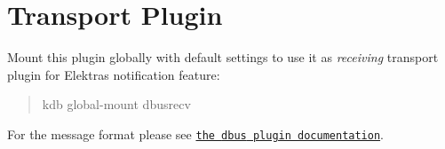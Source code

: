 \section*{Transport Plugin}

Mount this plugin globally with default settings to use it as {\itshape receiving} transport plugin for Elektra\textquotesingle{}s notification feature\+:

\begin{quote}
kdb global-\/mount dbusrecv \end{quote}


For the message format please see \href{https://www.libelektra.org/plugins/dbus#notification-format}{\tt the {\ttfamily dbus} plugin documentation}. 